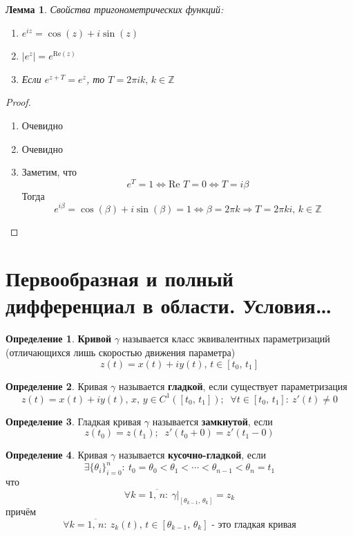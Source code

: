 \documentclass[a4paper,12pt]{article}
\theoremstyle{plain}
\newtheorem{lemma}{Лемма}[section]
\theoremstyle{definition}
\newtheorem{definition}{Определение}[section]
\theoremstyle{remark}
\begin{document}
\begin{lemma}
	Свойства тригонометрических функций:
	\begin{enumerate}
		\item $e^{iz} = \cos(z) + i\sin(z)$
		\item $\vert e^z\vert = e^{\text{Re}(z)}$
		\item Если $e^{z + T} = e^z$, то $T = 2\pi ik,\, k \in \mathbb{Z}$
	\end{enumerate}
\end{lemma}

\begin{proof}
	\begin{enumerate}
		\item Очевидно
		\item Очевидно
		\item Заметим, что
		      \[
			      e^T = 1 \Leftrightarrow \text{Re }T = 0 \Leftrightarrow T = i\beta
		      \]
		      Тогда
		      \[
			      e^{i\beta} = \cos(\beta) + i\sin(\beta) = 1 \Leftrightarrow \beta = 2\pi k \Rightarrow T = 2\pi ki,\, k \in \mathbb{Z}
		      \]
	\end{enumerate}
\end{proof}

\section{Первообразная и полный дифференциал в области. Условия\dots}
\begin{definition}
	\textbf{Кривой} $\gamma$ называется класс эквивалентных параметризаций (отличающихся лишь скоростью движения параметра)
	\[
		z(t) = x(t) + iy(t),\, t \in [t_0,\, t_1]
	\]
\end{definition}

\begin{definition}
	Кривая $\gamma$ называется \textbf{гладкой}, если существует параметризация
	\[
		z(t) = x(t) + iy(t),\, x,\, y \in C^1([t_0,\, t_1]);\;\; \forall t \in [t_0,\, t_1] :\: z'(t) \neq 0
	\]
\end{definition}

\begin{definition}
	Гладкая кривая $\gamma$ называется \textbf{замкнутой}, если
	\[
		z(t_0) = z(t_1);\;\; z'(t_0 + 0) = z'(t_1 - 0)
	\]
\end{definition}

\begin{definition}
	Кривая $\gamma$ называется \textbf{кусочно-гладкой}, если
	\[
		\exists\{\theta_i\}_{i = 0}^n :\: t_0 = \theta_0 < \theta_1 < \cdots < \theta_{n - 1} < \theta_n = t_1
	\]
	что
	\[
		\forall k = \overline{1,\,n} :\: \gamma|_{[\theta_{k - 1},\, \theta_k]} = z_k
	\]
	причём
	\[
		\forall k = \overline{1,\,n} :\: z_k(t),\, t \in [\theta_{k-1},\, \theta_k] \text{ - это гладкая кривая}
	\]
\end{definition}
\end{document}
